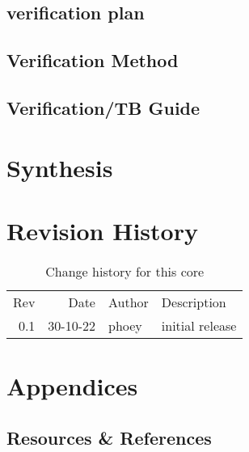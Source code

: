 \documentclass[11pt]{article}
\begin{document}
\subsection{verification plan}
\label{sec:org2b91e12}
\subsection{Verification Method}
\label{sec:org69071b8}
\subsection{Verification/TB Guide}
\label{sec:orgd9d0e0d}

\section{Synthesis}
\label{sec:org1e5ad77}
\subsection{}
\label{sec:orga55574c}

\section{Revision History}
\label{sec:org1b66c5d}
\begin{table}[htbp]
\caption{Change history for this core}
\centering
\begin{tabular}{rrll}
Rev & Date & Author & Description\\
0.1 & 30-10-22 & phoey & initial release\\
\end{tabular}
\end{table}

\section{Appendices}
\label{sec:orga679df8}
\subsection{Resources \& References}
\label{sec:orga6fca18}
\end{document}
